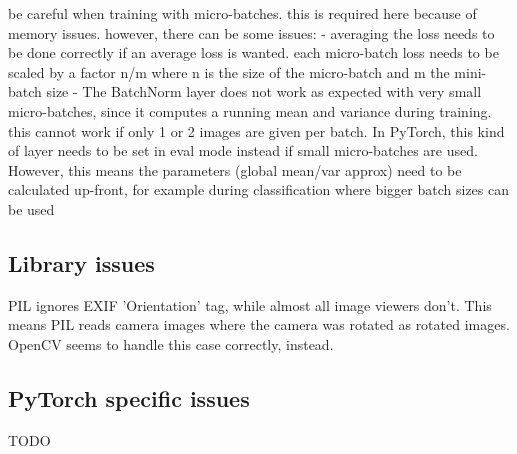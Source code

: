 \documentclass[fleqn]{article}
\begin{document}
be careful when training with micro-batches. this is required here because
of memory issues. however, there can be some issues:
    - averaging the loss needs to be done correctly if an average loss
    is wanted. each micro-batch loss needs to be scaled by a factor n/m
    where n is the size of the micro-batch and m the mini-batch size
    - The BatchNorm layer does not work as expected with very small
    micro-batches, since it computes a running mean and variance during
    training. this cannot work if only 1 or 2 images are given per batch.
    In PyTorch, this kind of layer needs to be set in eval mode instead
    if small micro-batches are used. However, this means the parameters
    (global mean/var approx) need to be calculated up-front, for example
    during classification where bigger batch sizes can be used

\subsection{Library issues}
PIL ignores EXIF 'Orientation' tag, while almost all image viewers don't.
This means PIL reads camera images where the camera was rotated as rotated
images. OpenCV seems to handle this case correctly, instead.

\subsection{PyTorch specific issues}
TODO
\end{document}

